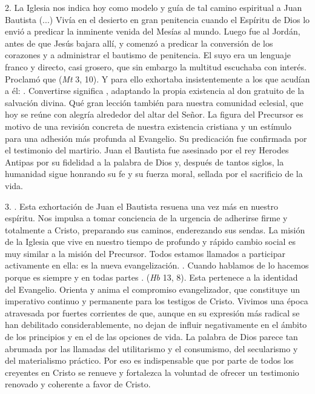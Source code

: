 \begin{body}
\begin{body}
		2. La Iglesia nos indica hoy como modelo y guía de tal camino espiritual a Juan Bautista (...) Vivía en el desierto en gran penitencia cuando el Espíritu de Dios lo envió a predicar la inminente venida del Mesías al mundo. Luego fue al Jordán, antes de que Jesús bajara allí, y comenzó a predicar la conversión de los corazones y a administrar el bautismo de penitencia. El suyo era un lenguaje franco y directo, casi grosero, que sin embargo la multitud escuchaba con interés. Proclamó que  (\emph{Mt} 3, 10). Y para ello exhortaba insistentemente a los que acudían a él: . Convertirse significa , adaptando la propia existencia al don gratuito de la salvación divina. Qué gran lección también para nuestra comunidad eclesial, que hoy se reúne con alegría alrededor del altar del Señor. La figura del Precursor es motivo de una revisión concreta de nuestra existencia cristiana y un estímulo para una adhesión más profunda al Evangelio. Su predicación fue confirmada por el testimonio del martirio. Juan el Bautista fue asesinado por el rey Herodes Antipas por su fidelidad a la palabra de Dios y, después de tantos siglos, la humanidad sigue honrando su fe y su fuerza moral, sellada por el sacrificio de la vida.
		
		3. . Esta exhortación de Juan el Bautista resuena una vez más en nuestro espíritu. Nos impulsa a tomar conciencia de la urgencia de adherirse firme y totalmente a Cristo, preparando sus caminos, enderezando sus sendas. La misión de la Iglesia que vive en nuestro tiempo de profundo y rápido cambio social es muy similar a la misión del Precursor. Todos estamos llamados a participar activamente en ella: es la nueva evangelización. . Cuando hablamos de  lo hacemos porque es siempre y en todas partes .  (\emph{Hb} 13, 8). Esta  pertenece a la identidad del Evangelio. Orienta y anima el compromiso evangelizador, que constituye un imperativo continuo y permanente para los testigos de Cristo. Vivimos una época atravesada por fuertes corrientes de  que, aunque en su expresión más radical se han debilitado considerablemente, no dejan de influir negativamente en el ámbito de los principios y en el de las opciones de vida. La palabra de Dios parece tan abrumada por las llamadas del utilitarismo y el consumismo, del secularismo y del materialismo práctico. Por eso es indispensable que por parte de todos los creyentes en Cristo se renueve y fortalezca la voluntad de ofrecer un testimonio renovado y coherente a favor de Cristo.
		

\end{body}
\end{body}
